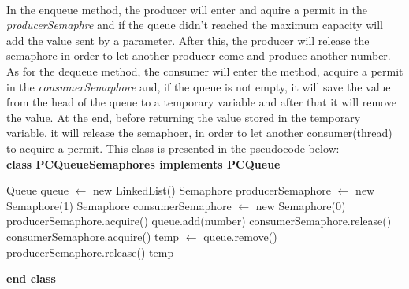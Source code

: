 \documentclass[14pt]{article}
\begin{document}
\vspace{2.5 mm}
\\In the enqueue method, the producer will enter and aquire a permit in the \textit{producerSemaphre} and if the queue didn't reached the maximum capacity will add the value sent by a parameter. After this, the producer will release the semaphore in order to let another producer come and produce another number. As for the dequeue method, the consumer will enter the method, acquire a permit in the \textit{consumerSemaphore} and, if the queue is not empty, it will save the value from the head of the queue to a temporary variable and after that it will remove the value. At the end, before returning the value stored in the temporary variable, it will release the semaphoer, in order to let another consumer(thread) to acquire a permit. This class is presented in the pseudocode below:
\vspace{2.5 mm}
\\\textbf{class PCQueueSemaphores implements PCQueue}
\begin{algorithmic}
\State Queue queue $\gets$ new LinkedList()
\State Semaphore producerSemaphore $\gets$ new Semaphore(1)
\State Semaphore consumerSemaphore $\gets$ new Semaphore(0)
    \State producerSemaphore.acquire()
        \State queue.add(number)
    \EndIf
    \State consumerSemaphore.release()
\EndFunction
\vspace{1 mm}
    \State consumerSemaphore.acquire()
        \State temp $\gets$ queue.remove()
    \EndIf
    \State producerSemaphore.release()
    \State \Return temp
\EndFunction
\end{algorithmic}
\textbf{end class}
\end{document}
